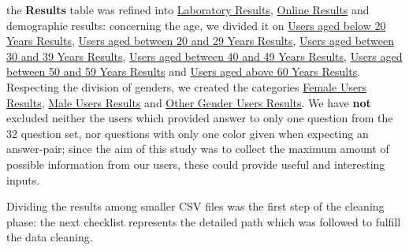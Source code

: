 the \textbf{Results} table was refined into \ul{Laboratory Results}, \ul{Online Results} and demographic results: concerning the age, we divided it
on \ul{Users aged below 20 Years Results}, \ul{Users aged between 20 and 29 Years Results}, \ul{Users aged between 30 and 39 Years Results},
\ul{Users aged between 40 and 49 Years Results}, \ul{Users aged between 50 and 59 Years Results} and \ul{Users aged above 60 Years Results}.
Respecting the division of genders, we created the categories \ul{Female Users Results}, \ul{Male Users Results} and \ul{Other Gender Users Results}. We
have \textbf{not} excluded neither the users which provided answer to only one question from the 32 question set, nor questions with only one color given when
expecting an answer-pair; since the aim of this study was to collect the maximum amount of possible information from our users, these could provide
useful and interesting inputs. \par
%
Dividing the results among smaller \gls{CSV} files was the first step of the cleaning phase: the next checklist represents the detailed path which
was followed to fulfill the data cleaning.
%
